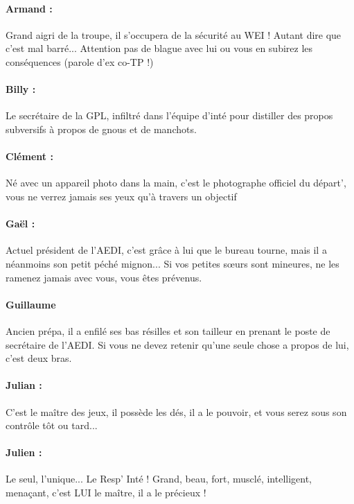 \paragraph{Armand :} Grand aigri de la troupe, il s'occupera de la sécurité au WEI ! Autant dire que c'est mal barré... Attention pas de blague avec lui ou vous en subirez les conséquences (parole d'ex co-TP !)

\paragraph{Billy :} Le secrétaire de la GPL, infiltré dans l'équipe d'inté pour distiller des propos subversifs à propos de gnous et de manchots.

\paragraph{Clément :} Né avec un appareil photo dans la main, c'est le photographe officiel du départ', vous ne verrez jamais ses yeux qu'à travers un objectif

\paragraph{Gaël :} Actuel président de l'AEDI, c'est grâce à lui que le bureau tourne, mais il a néanmoins son petit péché mignon... Si vos petites sœurs sont mineures, ne les ramenez jamais avec vous, vous êtes prévenus.

\paragraph{Guillaume} Ancien prépa, il a enfilé ses bas résilles et son tailleur en prenant le poste de secrétaire de l'AEDI. Si vous ne devez retenir qu'une seule chose a propos de lui, c'est deux bras.

\paragraph{Julian :} C'est le maître des jeux, il possède les dés, il a le pouvoir, et vous serez sous son contrôle tôt ou tard...
\clearpage
{}
\paragraph{Julien :}  Le seul, l'unique... Le Resp' Inté ! Grand, beau, fort, musclé, intelligent, menaçant, c'est LUI le maître, il a le précieux !
